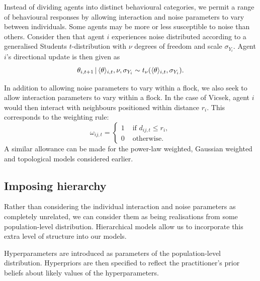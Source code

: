 Instead of dividing agents into distinct behavioural categories, we permit a range of
behavioural responses by allowing interaction and noise parameters to vary between
individuals. Some agents may be more or less susceptible to noise than others. Consider
then that agent $i$ experiences noise distributed according to a generalised Students
$t$-distribution with $\nu$ degrees of freedom and scale $\sigma_{Y_i}$. Agent $i$'s
directional update is then given as
\begin{equation*}
    \theta_{i,t+1} \,|\, \langle\theta\rangle_{i,t}, \nu, \sigma_{Y_i} \sim
    t_{\nu}(\langle\theta\rangle_{i,t}, \sigma_{Y_i}).
\end{equation*}

In addition to allowing noise parameters to vary within a flock, we also seek to allow
interaction parameters to vary within a flock. In the case of Vicsek, agent $i$ would then
interact with neighbours positioned within distance $r_i$. This corresponds to the
weighting rule:
\begin{equation}
    \omega_{ij,t} =
    \begin{cases}
        1 & \text{ if } d_{ij, t} \leq r_i,\\
        0 & \text{ otherwise.}
    \end{cases}
\end{equation}
A similar allowance can be made for the power-law weighted, Gaussian weighted and
topological models considered earlier.

\subsection{Imposing hierarchy}
\label{ssec:hier_mod}

Rather than considering the individual interaction and noise parameters as completely
unrelated, we can consider them as being realisations from some population-level
distribution. Hierarchical models allow us to incorporate this extra level of structure
into our models.

Hyperparameters are introduced as parameters of the population-level distribution.
Hyperpriors are then specified to reflect the practitioner's prior beliefs about likely
values of the hyperparameters.

